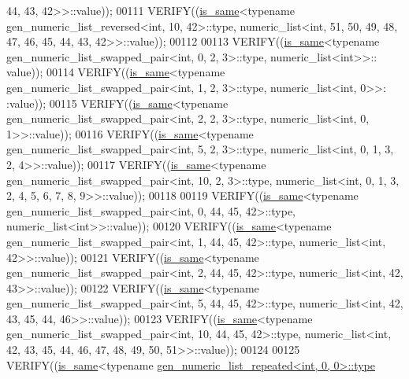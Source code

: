 \begin{DoxyCode}
       44, 43, 42>>::value));
00111   VERIFY((\hyperlink{struct_eigen_1_1internal_1_1is__same}{is\_same}<\textcolor{keyword}{typename} gen\_numeric\_list\_reversed<int, 10, 42>::type, numeric\_list<int, 51, 50,
       49, 48, 47, 46, 45, 44, 43, 42>>::value));
00112 
00113   VERIFY((\hyperlink{struct_eigen_1_1internal_1_1is__same}{is\_same}<\textcolor{keyword}{typename} gen\_numeric\_list\_swapped\_pair<int, 0, 2, 3>::type, numeric\_list<int>>::
      value));
00114   VERIFY((\hyperlink{struct_eigen_1_1internal_1_1is__same}{is\_same}<\textcolor{keyword}{typename} gen\_numeric\_list\_swapped\_pair<int, 1, 2, 3>::type, numeric\_list<int, 0>>:
      :value));
00115   VERIFY((\hyperlink{struct_eigen_1_1internal_1_1is__same}{is\_same}<\textcolor{keyword}{typename} gen\_numeric\_list\_swapped\_pair<int, 2, 2, 3>::type, numeric\_list<int, 0,
       1>>::value));
00116   VERIFY((\hyperlink{struct_eigen_1_1internal_1_1is__same}{is\_same}<\textcolor{keyword}{typename} gen\_numeric\_list\_swapped\_pair<int, 5, 2, 3>::type, numeric\_list<int, 0,
       1, 3, 2, 4>>::value));
00117   VERIFY((\hyperlink{struct_eigen_1_1internal_1_1is__same}{is\_same}<\textcolor{keyword}{typename} gen\_numeric\_list\_swapped\_pair<int, 10, 2, 3>::type, numeric\_list<int, 0,
       1, 3, 2, 4, 5, 6, 7, 8, 9>>::value));
00118 
00119   VERIFY((\hyperlink{struct_eigen_1_1internal_1_1is__same}{is\_same}<\textcolor{keyword}{typename} gen\_numeric\_list\_swapped\_pair<int, 0, 44, 45, 42>::type, 
      numeric\_list<int>>::value));
00120   VERIFY((\hyperlink{struct_eigen_1_1internal_1_1is__same}{is\_same}<\textcolor{keyword}{typename} gen\_numeric\_list\_swapped\_pair<int, 1, 44, 45, 42>::type, 
      numeric\_list<int, 42>>::value));
00121   VERIFY((\hyperlink{struct_eigen_1_1internal_1_1is__same}{is\_same}<\textcolor{keyword}{typename} gen\_numeric\_list\_swapped\_pair<int, 2, 44, 45, 42>::type, 
      numeric\_list<int, 42, 43>>::value));
00122   VERIFY((\hyperlink{struct_eigen_1_1internal_1_1is__same}{is\_same}<\textcolor{keyword}{typename} gen\_numeric\_list\_swapped\_pair<int, 5, 44, 45, 42>::type, 
      numeric\_list<int, 42, 43, 45, 44, 46>>::value));
00123   VERIFY((\hyperlink{struct_eigen_1_1internal_1_1is__same}{is\_same}<\textcolor{keyword}{typename} gen\_numeric\_list\_swapped\_pair<int, 10, 44, 45, 42>::type, 
      numeric\_list<int, 42, 43, 45, 44, 46, 47, 48, 49, 50, 51>>::value));
00124 
00125   VERIFY((\hyperlink{struct_eigen_1_1internal_1_1is__same}{is\_same}<\textcolor{keyword}{typename} \hyperlink{struct_eigen_1_1internal_1_1gen__numeric__list__repeated}{gen\_numeric\_list\_repeated<int, 0, 0>::type}

\end{DoxyCode}
